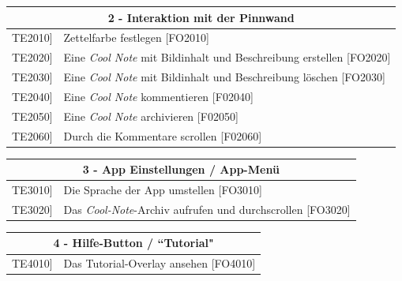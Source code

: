 \documentclass[a4paper]{scrreprt}
\begin{document}
	    \vspace{5mm}
	    
	    \begin{table}[h!]
	    	\centering
	    	\label{my-label}
	    	\begin{tabular}{p{2cm}p{12cm}}
	    		
	    		\multicolumn{2}{c}{\textbf{2 - Interaktion mit der Pinnwand}} \\ \hline
	    		\centering{[}TE2010{]} & Zettelfarbe festlegen {[}FO2010{]}\\
	    		\centering{[}TE2020{]}& Eine \textit{Cool Note}  mit Bildinhalt und Beschreibung erstellen {[}FO2020{]}                             \\
	    		\centering{[}TE2030{]}& Eine \textit{Cool Note} mit Bildinhalt und Beschreibung löschen {[}FO2030{]}\\ 
	    		\centering{[}TE2040{]}& Eine \textit{Cool Note} kommentieren {[}F02040{]}  \\ 
	    		\centering{[}TE2050{]}& Eine \textit{Cool Note} archivieren {[}F02050{]}\\ 
	    		\centering{[}TE2060{]}& Durch die Kommentare scrollen {[}F02060{]}\\ 
	    		\hline
	    	\end{tabular}
	    \end{table}
	    
	    \vspace{5mm}
	    
	    \begin{table}[h!]
	    	\centering
	    	\label{my-label}
	    	\begin{tabular}{p{2cm}p{12cm}}
	    		
	    		\multicolumn{2}{c}{\textbf{3 - App Einstellungen / App-Menü}} \\ \hline
	    		\centering{[}TE3010{]} & Die Sprache der App umstellen {[}FO3010{]}\\
	    		\centering{[}TE3020{]} & Das \textit{Cool-Note}-Archiv aufrufen und durchscrollen {[}FO3020{]}\\
	    		\hline
	    	\end{tabular}
	    \end{table}
	    
	    \vspace{5mm}
	    
	    \begin{table}[h!]
	    	\centering
	    	\label{my-label}
	    	\begin{tabular}{p{2cm}p{12cm}}
	    		
	    		\multicolumn{2}{c}{\textbf{4 - Hilfe-Button / ``Tutorial"}} \\ \hline
	    		\centering{[}TE4010{]} & Das Tutorial-Overlay ansehen {[}FO4010{]}\\    				
	    		\hline
	    	\end{tabular}
	    \end{table}
	    
\end{document}
